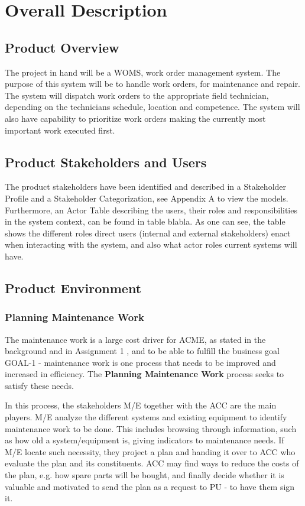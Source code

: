 \section{Overall Description}
\label{sec:overall_description}
\subsection{Product Overview}
The project in hand will be a WOMS, work order management system.  The purpose of this system will be to handle work orders, for maintenance and repair. The system will dispatch work orders to the appropriate field technician, depending on the technicians schedule, location and competence. The system will also have capability to prioritize  work orders  making the currently  most important work executed first.  

\subsection{Product Stakeholders and Users}
\label{sec:produt_stakeholders_and_users}
The product stakeholders have been identified and described in a Stakeholder Profile and a Stakeholder Categorization, see Appendix A to view the models. Furthermore, an Actor Table describing the users, their roles and responsibilities in the system context, can be found in table blabla. As one can see, the table shows the different roles direct users (internal and external stakeholders) enact when interacting with the system, and also what actor roles current systems will have. 
\subsection{Product Environment}
\label{sec:product_environment}
\subsubsection{Planning Maintenance Work}
\label{sec:bp1}
The maintenance work is a large cost driver for ACME, as stated in the background and in Assignment 1 \cite{ass1}, and to be able to fulfill the business goal GOAL-1 - maintenance work is one process that needs to be improved and increased in efficiency. The \textbf{Planning Maintenance Work} process seeks to satisfy these needs. 

In this process, the stakeholders M/E together with the ACC are the main players. M/E analyze the different systems and existing equipment to identify maintenance work to be done. This includes browsing through information, such as how old a system/equipment is, giving indicators to maintenance needs. If M/E locate such necessity, they project a plan and handing it over to ACC who evaluate the plan and its constituents. ACC may find ways to reduce the costs of the plan, e.g. how spare parts will be bought, and finally decide whether it is valuable and motivated to send the plan as a request to PU - to have them sign it.

